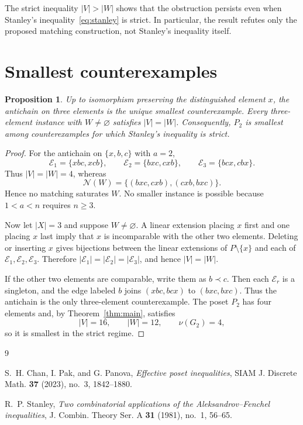 \documentclass[11pt]{amsart}
\newtheorem{proposition}[theorem]{Proposition}
\newcommand{\cE}{\mathcal E}
\newcommand{\cN}{\mathcal N}
\begin{document}
The strict inequality $|V|>|W|$ shows that the obstruction persists even
when Stanley's inequality~\eqref{eq:stanley} is strict. In particular, the
result refutes only the proposed matching construction, not Stanley's
inequality itself.

\section{Smallest counterexamples}

\begin{proposition}\label{prop:minimal}
Up to isomorphism preserving the distinguished element $x$, the antichain on
three elements is the unique smallest counterexample. Every three-element
instance with $W\ne\varnothing$ satisfies $|V|=|W|$. Consequently, $P_2$ is
smallest among counterexamples for which Stanley's inequality is strict.
\end{proposition}

\begin{proof}
For the antichain on $\{x,b,c\}$ with $a=2$,
\[
 \cE_1=\{xbc,xcb\},\qquad
 \cE_2=\{bxc,cxb\},\qquad
 \cE_3=\{bcx,cbx\}.
\]
Thus $|V|=|W|=4$, whereas
\[
 \cN(W)=\{(bxc,cxb),(cxb,bxc)\}.
\]
Hence no matching saturates $W$. No smaller instance is possible because
$1<a<n$ requires $n\ge3$.

Now let $|X|=3$ and suppose $W\ne\varnothing$. A linear extension placing $x$
first and one placing $x$ last imply that $x$ is incomparable with the other
two elements. Deleting or inserting $x$ gives bijections between the linear
extensions of $P\setminus\{x\}$ and each of $\cE_1,\cE_2,\cE_3$. Therefore
$|\cE_1|=|\cE_2|=|\cE_3|$, and hence $|V|=|W|$.

If the other two elements are comparable, write them as $b\prec c$. Then each
$\cE_r$ is a singleton, and the edge labeled $b$ joins $(xbc,bcx)$ to
$(bxc,bxc)$. Thus the antichain is the only three-element counterexample.
The poset $P_2$ has four elements and, by Theorem~\ref{thm:main}, satisfies
\[
 |V|=16,\qquad |W|=12,\qquad \nu(G_2)=4,
\]
so it is smallest in the strict regime.
\end{proof}

\begin{thebibliography}{9}

S.~H. Chan, I. Pak, and G. Panova,
\emph{Effective poset inequalities},
SIAM J. Discrete Math. \textbf{37} (2023), no.~3, 1842--1880.

R.~P. Stanley,
\emph{Two combinatorial applications of the Aleksandrov--Fenchel inequalities},
J. Combin. Theory Ser. A \textbf{31} (1981), no.~1, 56--65.

\end{thebibliography}
\end{document}
